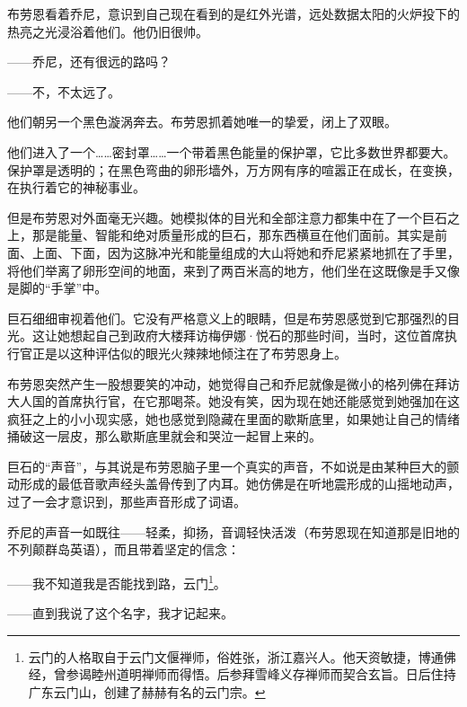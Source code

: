 \documentclass[AutoFakeBold=true]{book}
\begin{document}
布劳恩看着乔尼，意识到自己现在看到的是红外光谱，远处数据太阳的火炉投下的热亮之光浸浴着他们。他仍旧很帅。

{\kaishu ——乔尼，还有很远的路吗？}

{\kaishu ——不，不太远了。}

他们朝另一个黑色漩涡奔去。布劳恩抓着她唯一的挚爱，闭上了双眼。

\vspace*{1em}

他们进入了一个……密封罩……一个带着黑色能量的保护罩，它比多数世界都要大。保护罩是透明的；在黑色弯曲的卵形墙外，万方网有序的喧嚣正在成长，在变换，在执行着它的神秘事业。

但是布劳恩对外面毫无兴趣。她模拟体的目光和全部注意力都集中在了一个巨石之上，那是能量、智能和绝对质量形成的巨石，那东西横亘在他们面前。其实是前面、上面、下面，因为这脉冲光和能量组成的大山将她和乔尼紧紧地抓在了手里，将他们举离了卵形空间的地面，来到了两百米高的地方，他们坐在这既像是手又像是脚的``手掌''中。

巨石细细审视着他们。它没有严格意义上的眼睛，但是布劳恩感觉到它那强烈的目光。这让她想起自己到政府大楼拜访梅伊娜·悦石的那些时间，当时，这位首席执行官正是以这种评估似的眼光火辣辣地倾注在了布劳恩身上。

布劳恩突然产生一股想要笑的冲动，她觉得自己和乔尼就像是微小的格列佛在拜访大人国的首席执行官，在它那喝茶。她没有笑，因为现在她还能感觉到她强加在这疯狂之上的小小现实感，她也感觉到隐藏在里面的歇斯底里，如果她让自己的情绪捅破这一层皮，那么歇斯底里就会和哭泣一起冒上来的。

{}

巨石的``声音''，与其说是布劳恩脑子里一个真实的声音，不如说是由某种巨大的颤动形成的最低音歌声经头盖骨传到了内耳。她仿佛是在听地震形成的山摇地动声，过了一会才意识到，那些声音形成了词语。

乔尼的声音一如既往——轻柔，抑扬，音调轻快活泼（布劳恩现在知道那是旧地的不列颠群岛英语），而且带着坚定的信念：

{\kaishu ——我不知道我是否能找到路，云门}\footnote{云门的人格取自于云门文偃禅师，俗姓张，浙江嘉兴人。他天资敏捷，博通佛经，曾参谒睦州道明禅师而得悟。后参拜雪峰义存禅师而契合玄旨。日后住持广东云门山，创建了赫赫有名的云门宗。}。

{}

{\kaishu ——直到我说了这个名字，我才记起来。}

{\heiti [你的慢时间身体业已不再]}
\end{document}
